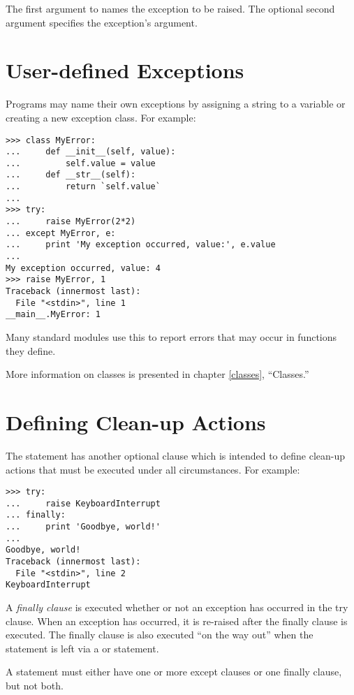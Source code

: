 \documentclass{manual}
\begin{document}
The first argument to  names the exception to be
raised.  The optional second argument specifies the exception's
argument.


\section{User-defined Exceptions \label{userExceptions}}

Programs may name their own exceptions by assigning a string to a
variable or creating a new exception class.  For example:

\begin{verbatim}
>>> class MyError:
...     def __init__(self, value):
...         self.value = value
...     def __str__(self):
...         return `self.value`
... 
>>> try:
...     raise MyError(2*2)
... except MyError, e:
...     print 'My exception occurred, value:', e.value
... 
My exception occurred, value: 4
>>> raise MyError, 1
Traceback (innermost last):
  File "<stdin>", line 1
__main__.MyError: 1
\end{verbatim}

Many standard modules use this to report errors that may occur in
functions they define.

More information on classes is presented in chapter \ref{classes},
``Classes.''


\section{Defining Clean-up Actions \label{cleanup}}

The  statement has another optional clause which is
intended to define clean-up actions that must be executed under all
circumstances.  For example:

\begin{verbatim}
>>> try:
...     raise KeyboardInterrupt
... finally:
...     print 'Goodbye, world!'
... 
Goodbye, world!
Traceback (innermost last):
  File "<stdin>", line 2
KeyboardInterrupt
\end{verbatim}

A \emph{finally clause} is executed whether or not an exception has
occurred in the try clause.  When an exception has occurred, it is
re-raised after the finally clause is executed.  The finally clause is
also executed ``on the way out'' when the  statement is
left via a  or  statement.

A  statement must either have one or more except clauses
or one finally clause, but not both.
\end{document}
